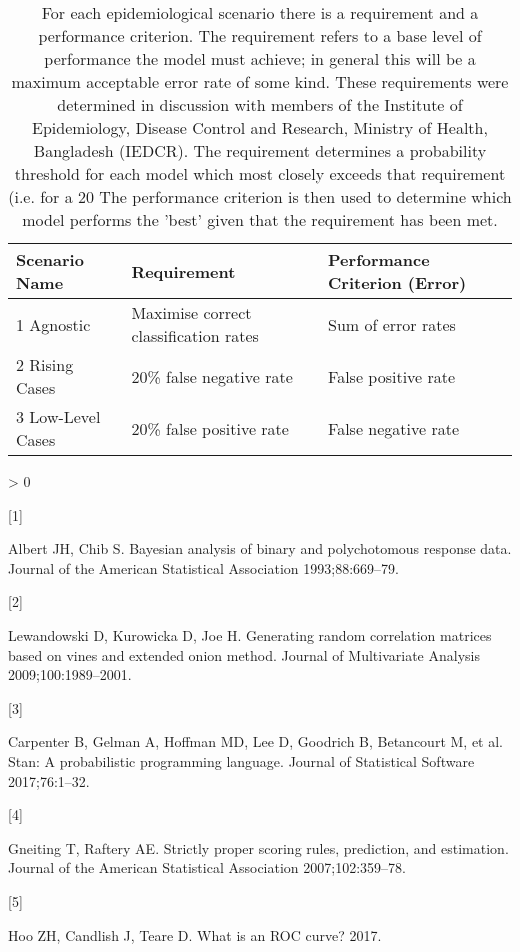 \documentclass[]{elsarticle} %
\newlength{\cslhangindent}
\newlength{\csllabelwidth}
\newenvironment{CSLReferences}[2] %
 {%
  \setlength{\parindent}{0pt}
  \ifodd #1 \everypar{\setlength{\hangindent}{\cslhangindent}}\ignorespaces\fi
  \ifnum #2 > 0
  \setlength{\parskip}{#2\baselineskip}
  \fi
 }%
 {}
\newcommand{\CSLLeftMargin}[1]{\parbox[t]{\csllabelwidth}{#1}}
\newcommand{\CSLRightInline}[1]{\parbox[t]{\linewidth - \csllabelwidth}{#1}\break}
\begin{document}
\begin{table}

\caption{\label{tab:scenarios-tab2}For each epidemiological scenario there is a requirement and a performance criterion.
The requirement refers to a base level of performance the model must achieve; in general this will be a maximum acceptable error rate of some kind.
These requirements were determined in discussion with members of the Institute of Epidemiology, Disease Control and Research, Ministry of Health, Bangladesh (IEDCR).
The requirement determines a probability threshold for each model which most closely exceeds that requirement (i.e. for a 20%
The performance criterion is then used to determine which model performs the 'best' given that the requirement has been met.}
\centering
\begin{tabu} to 
\toprule
Scenario Name & Requirement & Performance Criterion (Error)\\
 Agnostic & Maximise correct classification rates & Sum of error rates\\
2 Rising Cases & 20\% false negative rate & False positive rate\\
3 Low-Level Cases & 20\% false positive rate & False negative rate\\
\bottomrule
\end{tabu}
\end{table}

\hypertarget{refs}{}
\begin{CSLReferences}{0}{0}
\leavevmode\hypertarget{ref-albert1993bayesian}{}%
\CSLLeftMargin{{[}1{]} }
\CSLRightInline{Albert JH, Chib S. Bayesian analysis of binary and polychotomous response data. Journal of the American Statistical Association 1993;88:669--79.}

\leavevmode\hypertarget{ref-lewandowski2009generating}{}%
\CSLLeftMargin{{[}2{]} }
\CSLRightInline{Lewandowski D, Kurowicka D, Joe H. Generating random correlation matrices based on vines and extended onion method. Journal of Multivariate Analysis 2009;100:1989--2001.}

\leavevmode\hypertarget{ref-carpenter2017stan}{}%
\CSLLeftMargin{{[}3{]} }
\CSLRightInline{Carpenter B, Gelman A, Hoffman MD, Lee D, Goodrich B, Betancourt M, et al. Stan: A probabilistic programming language. Journal of Statistical Software 2017;76:1--32.}

\leavevmode\hypertarget{ref-gneiting2007strictly}{}%
\CSLLeftMargin{{[}4{]} }
\CSLRightInline{Gneiting T, Raftery AE. Strictly proper scoring rules, prediction, and estimation. Journal of the American Statistical Association 2007;102:359--78.}

\leavevmode\hypertarget{ref-hoo2017roc}{}%
\CSLLeftMargin{{[}5{]} }
\CSLRightInline{Hoo ZH, Candlish J, Teare D. What is an ROC curve? 2017.}

\end{CSLReferences}
\end{document}
